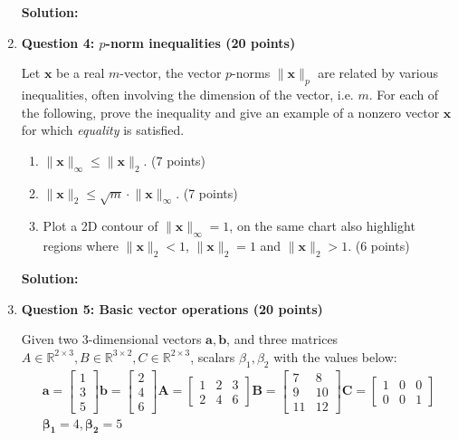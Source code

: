 \documentclass[11pt,letterpaper]{article}
\begin{document}
\begin{enumerate}
\textbf{Solution:}



\clearpage
\item[] \textbf{Question 4: $p$-norm inequalities (20 points)}

Let $\mathbf{x}$ be a real $m$-vector, the vector $p$-norms $\lVert \mathbf{x} \rVert_{p}$ are related by various inequalities, often involving the dimension of the vector, i.e. $m$. For each of the following, prove the inequality and give an example of a nonzero vector $\mathbf{x}$ for which \textit{equality} is satisfied. 
   
\begin{enumerate}
    \item $\lVert \mathbf{x} \rVert_\infty \le \lVert \mathbf{x} \rVert_2$. (7 points)
    \item $\lVert \mathbf{x} \rVert_2 \le \sqrt{m} \cdot \lVert \mathbf{x} \rVert_\infty$. (7 points)
    \item Plot a 2D contour of $\lVert \mathbf{x} \rVert_\infty = 1$, on the same chart also highlight regions where $\lVert \mathbf{x}\rVert_2  < 1$, $\lVert \mathbf{x}\rVert_2  = 1$ and $\lVert \mathbf{x}\rVert_2  > 1$. (6 points)
\end{enumerate}

\textbf{Solution:}

\clearpage
\item[] \textbf{Question 5: Basic vector operations (20 points)} 

Given two 3-dimensional vectors $\mathbf{a}, \mathbf{b}$, and three matrices $A \in \mathbb{R}^{2 \times 3}, B \in \mathbb{R}^{3 \times 2}, C \in \mathbb{R}^{2 \times 3}$, scalars $\beta_1, \beta_2$ with the values below:\\

\begin{gather*}
    \mathbf{a} = \begin{bmatrix} 1 \\ 3 \\ 5 \end{bmatrix} 
    \mathbf{b} = \begin{bmatrix} 2 \\ 4 \\ 6 \end{bmatrix} 
    \mathbf{A} = \begin{bmatrix} 1 & 2 & 3 \\ 2 & 4 & 6 \end{bmatrix} 
    \mathbf{B} = \begin{bmatrix} 7 & 8 \\ 9 & 10 \\ 11 & 12 \end{bmatrix} 
    \mathbf{C} = \begin{bmatrix} 1 & 0 & 0 \\ 0 & 0 & 1 \end{bmatrix} \\
    \mathbf{\beta_1} = 4, \mathbf{\beta_2} = 5
\end{gather*}




\end{enumerate}
\end{document}
